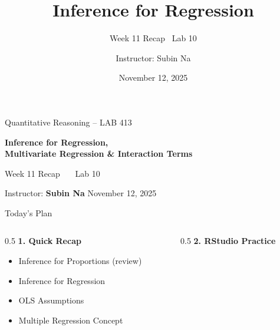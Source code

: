 \documentclass[aspectratio=169,11pt]{beamer}
\title{\bfseries Inference for Regression}
\subtitle{Week 11 Recap \textbullet\ Lab 10}
\author{Instructor: Subin Na}
\institute{Quantitative Reasoning -- LAB 413}
\date{November 12, 2025}
\begin{document}
{
\begin{frame}
  \vfill
  {\color{qrgray}\small Quantitative Reasoning -- LAB 413}\\[0.6em]
  {\color{qrnavy}\huge\bfseries Inference for Regression,\\[0.15em]Multivariate Regression \& Interaction Terms\par}
  \vspace{0.4em}
  {\color{qrblue}\large Week 11 Recap \ \textbullet\ \ Lab 10}\par
  \vspace{1.6em}
  {\color{qrgray} Instructor: \textbf{Subin Na} \hfill November 12, 2025}
  \vfill
\end{frame}
}

\begin{frame}{Today's Plan}
  \begin{columns}[T]
    \begin{column}{0.5\textwidth}
      \textbf{\color{qrnavy}1. Quick Recap}
      \begin{itemize}
        \item Inference for Proportions (review)
        \item Inference for Regression
        \item OLS Assumptions
        \item Multiple Regression Concept
      \end{itemize}
    \end{column}
    \begin{column}{0.5\textwidth}
      \vspace{2.2em}
      \textbf{\color{qrnavy}2. RStudio Practice}
    \end{column}
  \end{columns}
\end{frame}
\end{document}

